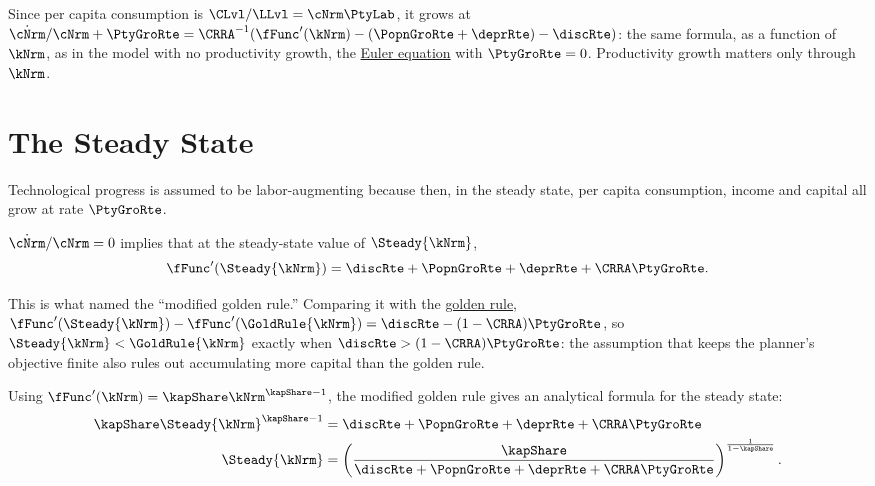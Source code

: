 \documentclass{econark}
\begin{document}
Since per capita consumption is $\CLvl/\LLvl = \cNrm \PtyLab$, it grows at $\dot{\cNrm}/\cNrm + \PtyGroRte = \CRRA^{-1}(\fFunc^{\prime}(\kNrm)-(\PopnGroRte+\deprRte)-\discRte)$: the same formula, as a function of $\kNrm$, as in the model with no productivity growth, the \hyperref[eq:cdotOc]{Euler equation} with $\PtyGroRte=0$. Productivity growth matters only through $\kNrm$.

\section{The Steady State}\label{sec:RCK-SteadyState}

Technological progress is assumed to be labor-augmenting because then,
in the steady state, per capita consumption, income
and capital all grow at rate $\PtyGroRte$.

$\dot{\cNrm}/\cNrm = 0$ implies that at the steady-state value of $\Steady{\kNrm}$,
\begin{equation}
  \fFunc^{\prime}(\Steady{\kNrm}) = \discRte +\PopnGroRte+\deprRte+\CRRA \PtyGroRte . \label{eq:RCK-modGoldenRule}
\end{equation}

This is what \citet{cassTurnpike} named the ``modified golden rule.'' Comparing it with the \hyperref[eq:RCK-goldenRule]{golden rule}, $\fFunc^{\prime}(\Steady{\kNrm}) - \fFunc^{\prime}(\GoldRule{\kNrm}) = \discRte - (1-\CRRA)\PtyGroRte$, so $\Steady{\kNrm} < \GoldRule{\kNrm}$ exactly when $\discRte > (1-\CRRA)\PtyGroRte$: the assumption that keeps the planner's objective finite also rules out accumulating more capital than the golden rule.

Using $\fFunc^{\prime}(\kNrm) = \kapShare \kNrm^{\kapShare-1}$, the modified golden rule gives an analytical formula for the steady state:
\begin{equation}\begin{gathered}\begin{aligned}
  \kapShare \Steady{\kNrm}^{\kapShare-1} & =  \discRte +\PopnGroRte+\deprRte+\CRRA \PtyGroRte  \\
  \Steady{\kNrm} & =  \left(\frac{\kapShare}{\discRte +\PopnGroRte+\deprRte+\CRRA \PtyGroRte}\right)^{\frac{1}{1-\kapShare}} . \label{eq:RCK-kSteadyCobbDouglas}
\end{aligned}\end{gathered}\end{equation}
\end{document}
